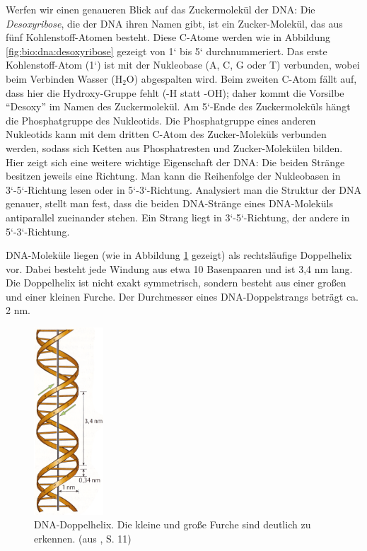 Werfen wir einen genaueren Blick auf das Zuckermolekül der DNA: Die \emph{Desoxyribose}, die der DNA ihren Namen gibt, ist ein Zucker-Molekül, das aus fünf Kohlenstoff-Atomen besteht. Diese C-Atome werden wie in Abbildung \ref{fig:bio:dna:desoxyribose} gezeigt von 1‘ bis 5‘ durchnummeriert. Das erste Kohlenstoff-Atom (1‘) ist mit der Nukleobase (A, C, G oder T) verbunden, wobei beim Verbinden Wasser ($\text{H}_2\text{O}$) abgespalten wird. Beim zweiten C-Atom fällt auf, dass hier die Hydroxy-Gruppe fehlt (-H statt -OH); daher kommt die Vorsilbe "`Desoxy"' im Namen des Zuckermolekül. Am 5‘-Ende des Zuckermoleküls hängt die Phosphatgruppe des Nukleotids. Die Phosphatgruppe eines anderen Nukleotids kann mit dem dritten C-Atom des Zucker-Moleküls verbunden werden, sodass sich Ketten aus Phosphatresten und Zucker-Molekülen bilden. 
Hier zeigt sich eine weitere wichtige Eigenschaft der DNA: Die beiden Stränge besitzen jeweils eine Richtung. Man kann die Reihenfolge der Nukleobasen in 3‘-5‘-Richtung lesen oder in 5‘-3‘-Richtung. Analysiert man die Struktur der DNA genauer, stellt man fest, dass die beiden DNA-Stränge eines DNA-Moleküls antiparallel zueinander stehen. Ein Strang liegt in 3‘-5‘-Richtung, der andere in 5‘-3‘-Richtung. 

DNA-Moleküle liegen (wie in Abbildung \ref{fig:bio:dna:doppelhelix} gezeigt) als rechtsläufige Doppelhelix vor. Dabei besteht jede Windung aus etwa 10 Basenpaaren und ist 3,4 nm lang. Die Doppelhelix ist nicht exakt symmetrisch, sondern besteht aus einer großen und einer kleinen Furche. Der Durchmesser eines DNA-Doppelstrangs beträgt ca. 2 nm.

\begin{figure}[htbp]
\begin{center}
\includegraphics[height=7cm]{bilder/DNA_Helix}
\end{center}
\caption[DNA-Doppelhelix. (aus \citep{Knippers2006}, S. 11)]{DNA-Doppelhelix. Die kleine und große Furche sind deutlich zu erkennen. (aus \citet{Knippers2006}, S. 11)}
\label{fig:bio:dna:doppelhelix}
\end{figure}

